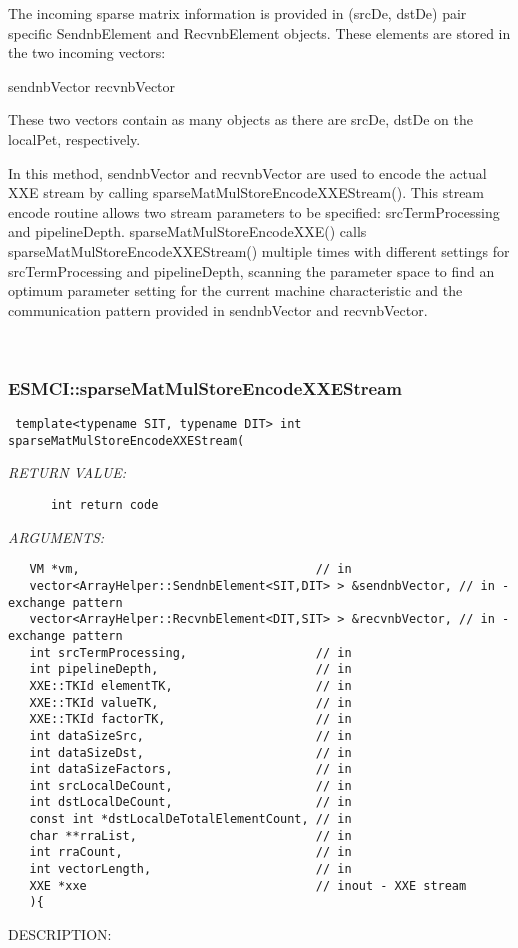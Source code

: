       The incoming sparse matrix information is provided in (srcDe, dstDe) pair
      specific SendnbElement and RecvnbElement objects. These elements are
      stored in the two incoming vectors:
  
        sendnbVector
        recvnbVector
  
      These two vectors contain as many objects as there are srcDe, dstDe on
      the localPet, respectively.
  
      In this method, sendnbVector and recvnbVector are used to encode the
      actual XXE stream by calling sparseMatMulStoreEncodeXXEStream(). This
      stream encode routine allows two stream parameters to be specified:
      srcTermProcessing and pipelineDepth. sparseMatMulStoreEncodeXXE() calls
      sparseMatMulStoreEncodeXXEStream() multiple times with different settings
      for srcTermProcessing and pipelineDepth, scanning the parameter space to
      find an optimum parameter setting for the current machine characteristic
      and the communication pattern provided in sendnbVector and recvnbVector.
   
 
\mbox{}\hrulefill\
 
\subsubsection [ESMCI::sparseMatMulStoreEncodeXXEStream] {ESMCI::sparseMatMulStoreEncodeXXEStream}


  
\begin{verbatim} template<typename SIT, typename DIT> int sparseMatMulStoreEncodeXXEStream(\end{verbatim}{\em RETURN VALUE:}
\begin{verbatim}      int return code\end{verbatim}{\em ARGUMENTS:}
\begin{verbatim}   VM *vm,                                 // in
   vector<ArrayHelper::SendnbElement<SIT,DIT> > &sendnbVector, // in - exchange pattern
   vector<ArrayHelper::RecvnbElement<DIT,SIT> > &recvnbVector, // in - exchange pattern
   int srcTermProcessing,                  // in
   int pipelineDepth,                      // in
   XXE::TKId elementTK,                    // in
   XXE::TKId valueTK,                      // in
   XXE::TKId factorTK,                     // in
   int dataSizeSrc,                        // in
   int dataSizeDst,                        // in
   int dataSizeFactors,                    // in
   int srcLocalDeCount,                    // in
   int dstLocalDeCount,                    // in
   const int *dstLocalDeTotalElementCount, // in
   char **rraList,                         // in
   int rraCount,                           // in
   int vectorLength,                       // in
   XXE *xxe                                // inout - XXE stream
   ){\end{verbatim}
{\sf DESCRIPTION:\\ }


